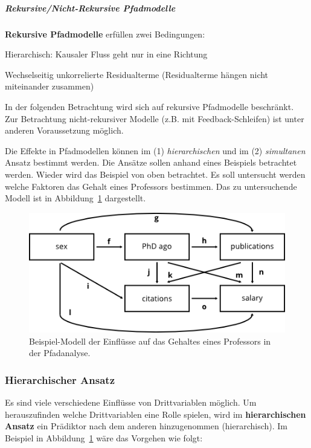 \documentclass{article}
\numberwithin{equation}{section}
\begin{document}
\subparagraph{Rekursive/Nicht-Rekursive Pfadmodelle}

\textbf{Rekursive Pfadmodelle} erfüllen zwei Bedingungen:

\begin{compactenum}
\item Hierarchisch: Kausaler Fluss geht nur in eine Richtung
\item Wechselseitig unkorrelierte Residualterme (Residualterme hängen nicht miteinander zusammen)
\end{compactenum}

In der folgenden Betrachtung wird sich auf rekursive Pfadmodelle beschränkt. Zur Betrachtung nicht-rekursiver Modelle (z.B. mit Feedback-Schleifen) ist unter anderen Voraussetzung möglich.

Die Effekte in Pfadmodellen können im (1) \emph{hierarchischen} und im (2) \emph{simultanen} Ansatz bestimmt werden. Die Ansätze sollen anhand eines Beispiels betrachtet werden. Wieder wird das Beispiel von oben betrachtet. Es soll untersucht werden welche Faktoren das Gehalt eines Professors bestimmen. Das zu untersuchende Modell ist in Abbildung~\ref{img:pfad-hierarchisch} dargestellt.

\begin{figure}[h]
  \centering
  \includegraphics{images/pfad-hierarchisch.png}
  \caption{Beispiel-Modell der Einflüsse auf das Gehaltes eines Professors in der Pfadanalyse.}
  \label{img:pfad-hierarchisch}
\end{figure}

\subsubsection{Hierarchischer Ansatz}

Es sind viele verschiedene Einflüsse von Drittvariablen möglich. Um herauszufinden welche Drittvariablen eine Rolle spielen, wird im \textbf{hierarchischen Ansatz} ein Prädiktor nach dem anderen hinzugenommen (hierarchisch). Im Beispiel in Abbildung~\ref{img:pfad-hierarchisch} wäre das Vorgehen wie folgt:
\end{document}
